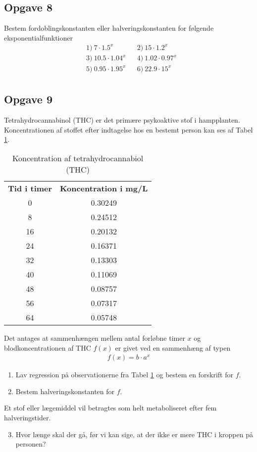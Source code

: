 \subsection*{Opgave 8}
Bestem fordoblingskonstanten eller halveringskonstanten for følgende eksponentialfunktioner
\begin{align*}
	&1) \ 7\cdot 1.5^x   &&2) \ 15\cdot 1.2^x   \\
	&3) \ 10.5\cdot 1.04^x   &&4) \ 1.02\cdot 0.97^x   \\
	&5) \ 0.95\cdot 1.95^x   &&6) \ 22.9\cdot 15^x   \\		
\end{align*}

\subsection*{Opgave 9}
Tetrahydrocannabinol (THC) er det primære psykoaktive stof i hampplanten. Koncentrationen af stoffet efter indtagelse hos en bestemt person kan ses af Tabel \ref{tab:cannabis}.

\begin{table}[H]
	\centering
	\begin{tabular}{cc}
		\textbf{Tid i timer} & \textbf{Koncentration i mg/L} \\

		0 & 0.30249 \\

		8 & 0.24512 \\
 
		16 &  0.20132 \\

		24 & 0.16371 \\

		32 & 0.13303\\

		40 & 0.11069\\

		48 & 0.08757\\
		56 & 0.07317\\

		64 & 0.05748
	\end{tabular}
	\caption{Koncentration af tetrahydrocannabiol (THC)}
	\label{tab:cannabis}
\end{table}

Det antages at sammenhængen mellem antal forløbne timer $x$ og blodkoncentrationen af THC $f(x)$ er givet ved en sammenhæng af typen
\begin{align*}
	f(x) = b \cdot a^x
\end{align*}
\begin{enumerate}[label=\roman*)]
	\item Lav regression på observationerne fra Tabel \ref{tab:cannabis} og bestem en forskrift for $f$.
	\item Bestem halveringskonstanten for $f$.
\end{enumerate}
Et stof eller lægemiddel vil betragtes som helt metaboliseret efter fem halveringstider.

\begin{enumerate}[label=\roman*)]
	\setcounter{enumi}{2}
	\item Hvor længe skal der gå, før vi kan sige, at der ikke er mere THC i kroppen på personen?
\end{enumerate}

